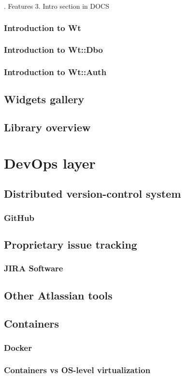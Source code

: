 \documentclass[a4paper,12pt]{article}
\begin{document}
{{. Features
3. Intro section in DOCS}
\subsubsection{Introduction to Wt}
\subsubsection{Introduction to Wt::Dbo}
\subsubsection{Introduction to Wt::Auth}
\subsection{Widgets gallery}
\subsection{Library overview}

\section{DevOps layer}
\subsection{Distributed version-control system}}
\subsubsection{GitHub}
\subsection{Proprietary issue tracking}
\subsubsection{JIRA Software}
\subsection{Other Atlassian tools}
\subsection{Containers}
\subsubsection{Docker}
\subsubsection{Containers vs OS-level virtualization}
\end{document}
